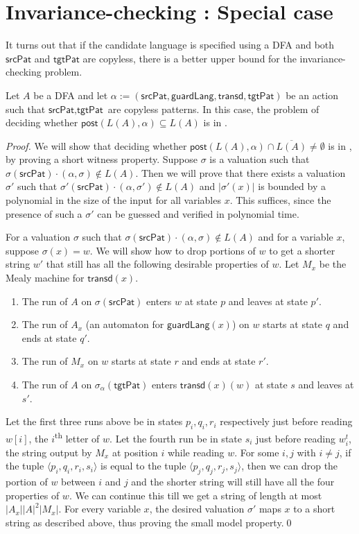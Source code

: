 \documentclass[12pt, a4paper]{article}
\newcommand{\A}{\aut}
\newcommand{\T}{\textsf{transd}}
\newcommand{\post}{\textsf{post}}
\newcommand{\ssub}{\sigma} %
\newcommand{\spat}{\textsf{srcPat}}
\newcommand{\tpat}{\textsf{tgtPat}}
\newcommand{\guardL}{\textsf{guardLang}}
\renewcommand{\aut}{A}
\begin{document}

\section{Invariance-checking : Special case}

It turns out that if the candidate language is specified using a DFA and both $\spat$ and $\tpat$ are copyless, there is a better upper bound
for the invariance-checking problem.
%
\begin{theorem}
	Let $\A$ be a DFA and let $\alpha := (\spat, \guardL, \T, \tpat)$ be an action such that $\spat, \tpat$ are copyless patterns. In this case, the problem of deciding whether $\post(L(\A), \alpha) \subseteq L(\A)$ is in \conp.
\end{theorem}
%
\begin{proof}
	We will show that deciding whether $\post(L(\A), \alpha) \cap \overline{L(\A)} \neq \emptyset$ is in \np, by proving a short witness 
	property. Suppose $\ssub$ is a valuation such that $\ssub(\spat)\cdot (\alpha,\ssub) \not\in L(A)$. Then we will prove that there exists
	a valuation $\ssub'$ such that $\ssub'(\spat)\cdot (\alpha,\ssub') \not\in L(A)$ and $|\ssub'(x)|$ is bounded by a polynomial in the
	size of the input for all variables $x$. This suffices, since the presence of such a $\ssub'$ can be guessed and verified in
	polynomial time.

	For a valuation $\ssub$ such that $\ssub(\spat)\cdot (\alpha,\ssub) \not\in L(A)$ and for a variable $x$, suppose $\ssub(x)=w$.
	We will show how to drop portions of $w$ to get a shorter string $w'$ that still has all the following desirable properties of $w$. Let
	$M_x$ be the Mealy machine for $\T(x)$.
	\begin{enumerate}
		\item The run of $A$ on $\ssub(\spat)$ enters $w$ at state $p$ and leaves at state $p'$.
		\item The run of $A_x$ (an automaton for $\guardL(x)$) on $w$ starts at state $q$ and ends at state $q'$.
		\item The run of $M_x$ on $w$ starts at state $r$ and ends at state $r'$.
		\item The run of $A$ on $\ssub_\alpha(\tpat)$ enters $\T(x)(w)$ at state $s$ and leaves at $s'$.
	\end{enumerate}
	Let the first three runs above be in states $p_i, q_i, r_i$ respectively just before reading $w[i]$, the $i$\textsuperscript{th}
	letter of $w$. Let the fourth run be in state $s_i$ just before reading $w_i^t$, the string output by $M_x$ at position $i$
	while reading $w$. For some $i, j$ with $i \ne j$,  if the tuple $\langle p_i, q_i, r_i, s_i\rangle$ is equal to the tuple
	$\langle p_j, q_j, r_j, s_j\rangle$, then we can drop the portion of $w$ between $i$ and $j$ and the shorter string will still have
	all the four properties of $w$. We can continue this till we get a string of length at most $|\A_x||\A|^2|M_x|$. For every variable
	$x$, the desired valuation $\ssub'$ maps $x$ to a short string as described above, thus proving the small model property.\qed
\end{proof}
\end{document}
